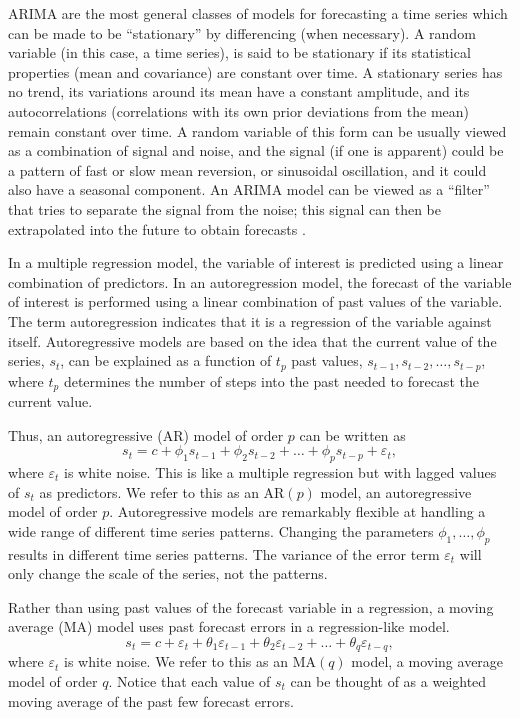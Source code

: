 ARIMA are the most general classes of models for forecasting a time series which can be made to be ``stationary'' by differencing (when necessary). A random variable (in this case, a time series), is said to be stationary if its statistical properties (mean and covariance) are constant over time.  A stationary series has no trend, its variations around its mean have a constant amplitude, and its autocorrelations (correlations with its own prior deviations from the mean) remain constant over time.  A random variable of this form can be usually viewed as a combination of signal and noise, and the signal (if one is apparent) could be a pattern of fast or slow mean reversion, or sinusoidal oscillation, and it could also have a seasonal component. An ARIMA model can be viewed as a ``filter'' that tries to separate the signal from the noise; this signal can then be extrapolated into the future to obtain forecasts \cite{Chatfield2019}.

In a multiple regression model, the variable of interest is predicted using a linear combination of predictors. In an autoregression model, the forecast of the variable of interest is performed using a linear combination of past values of the variable. The term autoregression indicates that it is a regression of the variable against itself. Autoregressive models are based on the idea that the current value of the series, $s_{t}$, can be explained as a function of $t_{p}$ past values, $s_{t-1}, s_{t-2}, \ldots, s_{t-p}$, where $t_{p}$ determines the number of steps into the past needed to forecast the current value. 

Thus, an autoregressive (AR) model of order $p$ can be written as 
\begin{equation}
    \label{Eq:AR_p}
    s_{t} = c + \phi_{1} s_{t-1} + \phi_{2} s_{t-2} + \ldots +\phi_{p}s_{t-p} + \varepsilon_{t},
\end{equation} where $\varepsilon_{t}$ is white noise. This is like a multiple regression but with lagged values of $s_{t}$ as predictors. We refer to this as an AR$(p)$ model, an autoregressive model of order $p$. Autoregressive models are remarkably flexible at handling a wide range of different time series patterns. Changing the parameters $\phi_{1},\ldots, \phi_{p}$ results in different time series patterns. The variance of the error term $\varepsilon_{t}$ will only change the scale of the series, not the patterns.

Rather than using past values of the forecast variable in a regression, a moving average (MA) model uses past forecast errors in a regression-like model. 
\begin{equation}
    \label{Eq:MA_q}
    s_{t} = c + \varepsilon_{t} + \theta_{1} \varepsilon_{t-1} + \theta_{2}\varepsilon_{t-2} + \ldots + \theta_{q} \varepsilon_{t-q},    
\end{equation}
 where $\varepsilon_{t}$ is white noise. We refer to this as an MA$(q)$ model, a moving average model of order $q$. Notice that each value of $s_{t}$ can be thought of as a weighted moving average of the past few forecast errors.

